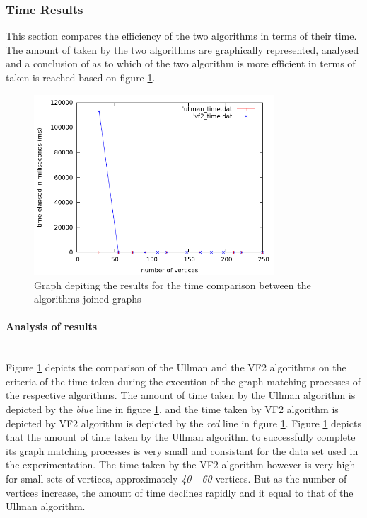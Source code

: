 \subsubsection{Time Results}
\label{Time Results}
This section compares the efficiency of the two algorithms in terms of their time. The amount of taken by the two algorithms are graphically 
represented, analysed and a conclusion of as to which of the two algorithm is more efficient in terms of taken is reached based on figure \ref{fig:time_comparison}.
\begin{figure}[H]
  \begin{center}
      \includegraphics[width=0.8\textwidth]{time_comparison.png}
  \end{center}    
  \caption{Graph depiting the results for the time comparison between the algorithms joined graphs}
  \label{fig:time_comparison}
\end{figure}

\paragraph{Analysis of results}\mbox{}\\
Figure \ref{fig:time_comparison} depicts the comparison of the Ullman and the VF2 algorithms on the criteria of the time taken during the execution of the graph matching processes
of the respective algorithms.\newline\newline
The amount of time taken by the Ullman algorithm is depicted by the \textit{blue} line in figure \ref{fig:time_comparison}, and the time taken by VF2 algorithm 
is depicted by VF2 algorithm is depicted by the \textit{red} line in figure \ref{fig:time_comparison}.\newline\newline
Figure \ref{fig:time_comparison} depicts that the amount of time taken by the Ullman algorithm to successfully complete its graph matching processes is very 
small and consistant for the data set used in the experimentation.\newline\newline
The time taken by the VF2 algorithm however is very high for small sets of vertices, approximately \textit{40 - 60} vertices. But as the number of vertices 
increase, the amount of time declines rapidly and it equal to that of the Ullman algorithm.

